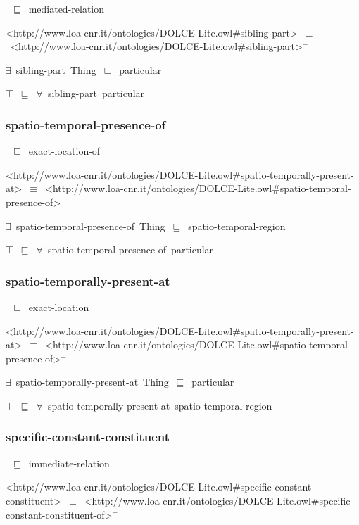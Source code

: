\documentclass{article}
\begin{document}
~\ensuremath{\sqsubseteq}~mediated-relation

<http://www.loa-cnr.it/ontologies/DOLCE-Lite.owl#sibling-part>~\ensuremath{\equiv}~<http://www.loa-cnr.it/ontologies/DOLCE-Lite.owl#sibling-part>\ensuremath{^-}

\ensuremath{\exists}~sibling-part~Thing~\ensuremath{\sqsubseteq}~particular

\ensuremath{\top}~\ensuremath{\sqsubseteq}~\ensuremath{\forall}~sibling-part~particular

\subsubsection*{spatio-temporal-presence-of}

~\ensuremath{\sqsubseteq}~exact-location-of

<http://www.loa-cnr.it/ontologies/DOLCE-Lite.owl#spatio-temporally-present-at>~\ensuremath{\equiv}~<http://www.loa-cnr.it/ontologies/DOLCE-Lite.owl#spatio-temporal-presence-of>\ensuremath{^-}

\ensuremath{\exists}~spatio-temporal-presence-of~Thing~\ensuremath{\sqsubseteq}~spatio-temporal-region

\ensuremath{\top}~\ensuremath{\sqsubseteq}~\ensuremath{\forall}~spatio-temporal-presence-of~particular

\subsubsection*{spatio-temporally-present-at}

~\ensuremath{\sqsubseteq}~exact-location

<http://www.loa-cnr.it/ontologies/DOLCE-Lite.owl#spatio-temporally-present-at>~\ensuremath{\equiv}~<http://www.loa-cnr.it/ontologies/DOLCE-Lite.owl#spatio-temporal-presence-of>\ensuremath{^-}

\ensuremath{\exists}~spatio-temporally-present-at~Thing~\ensuremath{\sqsubseteq}~particular

\ensuremath{\top}~\ensuremath{\sqsubseteq}~\ensuremath{\forall}~spatio-temporally-present-at~spatio-temporal-region

\subsubsection*{specific-constant-constituent}

~\ensuremath{\sqsubseteq}~immediate-relation

<http://www.loa-cnr.it/ontologies/DOLCE-Lite.owl#specific-constant-constituent>~\ensuremath{\equiv}~<http://www.loa-cnr.it/ontologies/DOLCE-Lite.owl#specific-constant-constituent-of>\ensuremath{^-}
\end{document}
